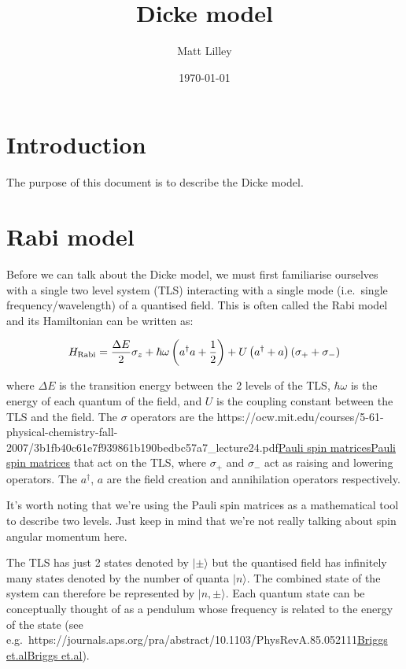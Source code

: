 \documentclass[
]{article}
\title{Dicke model}
\author{Matt Lilley}
\date{\today}  %
\let\oldhref\href
\renewcommand{\href}[2]{\ifx#1\urlprefix\oldhref{#1}{#2}\else\uline{\oldhref{#1}{#2}}\fi}
\renewcommand{\[}{\begin{equation}}
\renewcommand{\]}{\end{equation}}
\begin{document}
\maketitle

\section{Introduction}\label{introduction}

The purpose of this document is to describe the Dicke model.

\section{Rabi model}\label{rabi-model}

Before we can talk about the Dicke model, we must first familiarise
ourselves with a single two level system (TLS) interacting with a single
mode (i.e.~single frequency/wavelength) of a quantised field. This is
often called the Rabi model and its Hamiltonian can be written as:

\[
H_{\rm Rabi} = \frac{\Delta E}{2} \sigma_z + \hbar\omega\left(a^{\dagger}a +\frac{1}{2}\right) + U\left( a^{\dagger} + a \right)(\sigma_+ + \sigma_-)
\label{eq:rabiH}
\]

where \(\Delta E\) is the transition energy between the 2 levels of the
TLS, \(\hbar\omega\) is the energy of each quantum of the field, and
\(U\) is the coupling constant between the TLS and the field. The
\(\sigma\) operators are the
\href{https://ocw.mit.edu/courses/5-61-physical-chemistry-fall-2007/3b1fb40c61e7f939861b190bedbc57a7_lecture24.pdf}{Pauli
spin matrices} that act on the TLS, where \(\sigma_+\) and \(\sigma_-\)
act as raising and lowering operators. The \(a^{\dagger}\), \(a\) are
the field creation and annihilation operators respectively.

It's worth noting that we're using the Pauli spin matrices as a
mathematical tool to describe two levels. Just keep in mind that we're
not really talking about spin angular momentum here.

The TLS has just 2 states denoted by \(|\pm\rangle\) but the quantised
field has infinitely many states denoted by the number of quanta
\(|n\rangle\). The combined state of the system can therefore be
represented by \(|n, \pm\rangle\). Each quantum state can be
conceptually thought of as a pendulum whose frequency is related to the
energy of the state (see
e.g.~\href{https://journals.aps.org/pra/abstract/10.1103/PhysRevA.85.052111}{Briggs
et.al}).
\end{document}
